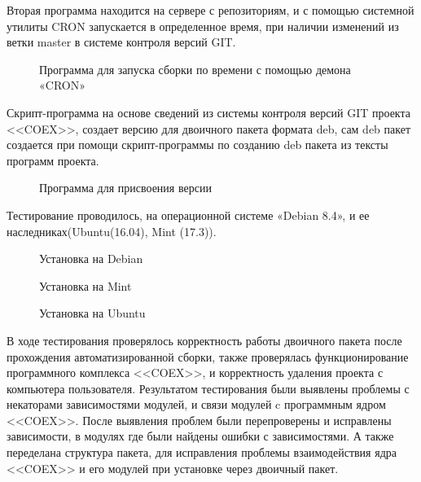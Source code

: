 Вторая программа находится на сервере с репозиториям, и с помощью системной утилиты CRON запускается в определенное время, при наличии изменений из ветки master в системе контроля версий GIT.

\begin{figure}[!ht]
\caption{ Программа  для запуска сборки по времени  с помощью демона  «CRON» }
\label{ser_2:ser_2}
\end{figure}

Скрипт-программа на основе сведений из системы контроля версий GIT проекта <<COEX>>, создает версию для двоичного пакета формата deb, сам deb пакет создается при помощи скрипт-программы по созданию  deb пакета из тексты программ проекта.

\begin{figure}[!ht]
\caption{ Программа для присвоения версии }
\label{ser_3:ser_3}
\end{figure}

Тестирование проводилось, на операционной системе «Debian 8.4», и ее наследниках(Ubuntu(16.04), Mint (17.3)).

\begin{figure}[!ht]
\caption{ Установка на Debian }
\label{ser_4:ser_4}
\end{figure}

\begin{figure}[!ht]
\caption{ Установка на Mint }
\label{ser_5:ser_5}
\end{figure}

\begin{figure}[!ht]
\caption{ Установка на Ubuntu }
\label{ser_6:ser_6}
\end{figure}

В ходе тестирования проверялось корректность работы двоичного пакета после прохождения автоматизированной сборки, также проверялась функционирование программного комплекса <<COEX>>, и корректность удаления проекта с компьютера пользователя. Результатом тестирования были выявлены проблемы с некаторами зависимостями модулей, и связи модулей c программным ядром <<COEX>>. После выявления проблем были перепроверены и исправлены зависимости, в модулях где были найдены ошибки с зависимостями. А также переделана структура пакета, для исправления проблемы взаимодействия ядра <<COEX>> и его модулей при установке через двоичный пакет.  

\clearpage
